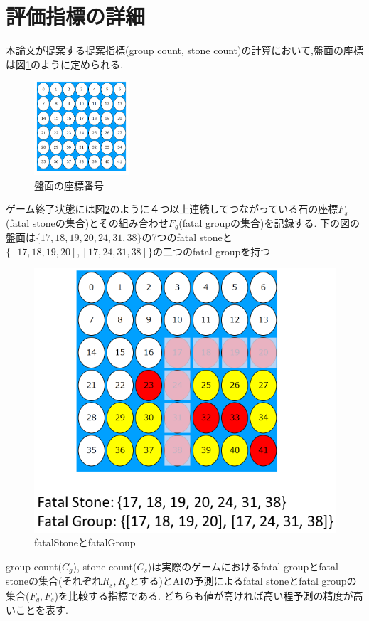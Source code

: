 \section{評価指標の詳細}
本論文が提案する提案指標(group count, stone count)の計算において,盤面の座標は図\ref{fig:index}のように定められる.
\begin{figure}[t]
	\centering
	\includegraphics[width=100pt]{./figure/index.png}
	\caption{盤面の座標番号}
	\label{fig:index}
\end{figure}
ゲーム終了状態には図\ref{fig:fatalGroup}のように４つ以上連続してつながっている石の座標$F_s$(fatal stoneの集合)とその組み合わせ$F_g$(fatal groupの集合)を記録する.
下の図の盤面は$\{17, 18, 19, 20, 24, 31, 38\}$の7つのfatal stoneと$\{[17, 18, 19, 20], [17, 24, 31, 38]\}$の二つのfatal groupを持つ
\begin{figure}[t]
	\centering
	\includegraphics[width=\linewidth]{./figure/fatalGroup.png}
	\caption{fatalStoneとfatalGroup}
	\label{fig:fatalGroup}
\end{figure}
group count($C_g$), stone count($C_s$)は実際のゲームにおけるfatal groupとfatal stoneの集合(それぞれ$R_s, R_g$とする)とAIの予測によるfatal stoneとfatal groupの集合($F_g, F_s$)を比較する指標である.
どちらも値が高ければ高い程予測の精度が高いことを表す.
